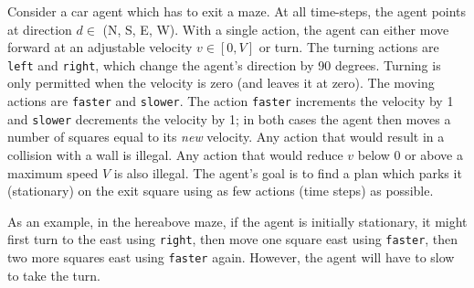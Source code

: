 \documentclass[11pt, a4paper]{article}
\begin{document}
Consider a car agent which has to exit a maze. At all time-steps, the agent points at direction $d \in$ (N, S, E, W). With a single action, the agent can either move forward at an adjustable velocity $v \in [0, V]$ or turn. The turning actions are \texttt{left} and \texttt{right}, which change the agent's direction by 90 degrees. Turning is only permitted when the velocity is zero (and leaves it at zero). The moving actions are \texttt{faster} and \texttt{slower}. The action \texttt{faster} increments the velocity by 1 and \texttt{slower} decrements the velocity by 1; in both cases the agent then moves a number of squares equal to its \emph{new} velocity. Any action that would result in a collision with a wall is illegal. Any action that would reduce $v$ below 0 or above a maximum speed $V$ is also illegal. The agent's goal is to find a plan which parks it (stationary) on the exit square using as few actions (time steps) as possible.

As an example, in the hereabove maze, if the agent is initially stationary, it might first turn to the east using \texttt{right}, then move one square east using \texttt{faster}, then two more squares east using \texttt{faster} again. However, the agent will have to slow to take the turn.
\end{document}
